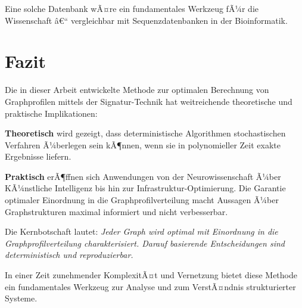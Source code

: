 ﻿\documentclass[a4paper,12pt]{article}
\theoremstyle{definition}
\begin{document}
	Eine solche Datenbank wÃ¤re ein fundamentales Werkzeug fÃ¼r die Wissenschaft â€“ vergleichbar mit Sequenzdatenbanken in der Bioinformatik.
	
	\section{Fazit}
	
	Die in dieser Arbeit entwickelte Methode zur optimalen Berechnung von Graphprofilen mittels der Signatur-Technik hat weitreichende theoretische und praktische Implikationen:
	
	\textbf{Theoretisch} wird gezeigt, dass deterministische Algorithmen stochastischen Verfahren Ã¼berlegen sein kÃ¶nnen, wenn sie in polynomieller Zeit exakte Ergebnisse liefern.
	
	\textbf{Praktisch} erÃ¶ffnen sich Anwendungen von der Neurowissenschaft Ã¼ber KÃ¼nstliche Intelligenz bis hin zur Infrastruktur-Optimierung. Die Garantie optimaler Einordnung in die Graphprofilverteilung macht Aussagen Ã¼ber Graphstrukturen maximal informiert und nicht verbesserbar.
	
	Die Kernbotschaft lautet: \textit{Jeder Graph wird optimal mit Einordnung in die Graphprofilverteilung charakterisiert. Darauf basierende Entscheidungen sind deterministisch und reproduzierbar.}
	
	In einer Zeit zunehmender KomplexitÃ¤t und Vernetzung bietet diese Methode ein fundamentales Werkzeug zur Analyse und zum VerstÃ¤ndnis strukturierter Systeme.
\end{document}

